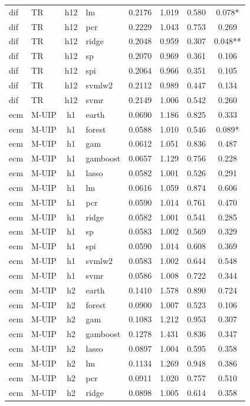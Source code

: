 \begin{ThreePartTable}
\begin{longtable}[t]{llclcccc}
dif & TR & h12 & lm & 0.2176 & 1.019 & 0.580 & 0.078*\\
dif & TR & h12 & pcr & 0.2229 & 1.043 & 0.753 & 0.269\\
dif & TR & h12 & ridge & 0.2048 & 0.959 & 0.307 & 0.048**\\
dif & TR & h12 & sp & 0.2070 & 0.969 & 0.361 & 0.106\\
dif & TR & h12 & spi & 0.2064 & 0.966 & 0.351 & 0.105\\
dif & TR & h12 & svmlw2 & 0.2112 & 0.989 & 0.447 & 0.134\\
dif & TR & h12 & svmr & 0.2149 & 1.006 & 0.542 & 0.260\\
\addlinespace
ecm & M-UIP & h1 & earth & 0.0690 & 1.186 & 0.825 & 0.333\\
ecm & M-UIP & h1 & forest & 0.0588 & 1.010 & 0.546 & 0.089*\\
ecm & M-UIP & h1 & gam & 0.0612 & 1.051 & 0.836 & 0.487\\
ecm & M-UIP & h1 & gamboost & 0.0657 & 1.129 & 0.756 & 0.228\\
ecm & M-UIP & h1 & lasso & 0.0582 & 1.001 & 0.526 & 0.291\\
ecm & M-UIP & h1 & lm & 0.0616 & 1.059 & 0.874 & 0.606\\
ecm & M-UIP & h1 & pcr & 0.0590 & 1.014 & 0.761 & 0.470\\
ecm & M-UIP & h1 & ridge & 0.0582 & 1.001 & 0.541 & 0.285\\
ecm & M-UIP & h1 & sp & 0.0583 & 1.002 & 0.569 & 0.329\\
ecm & M-UIP & h1 & spi & 0.0590 & 1.014 & 0.608 & 0.369\\
ecm & M-UIP & h1 & svmlw2 & 0.0583 & 1.002 & 0.644 & 0.548\\
ecm & M-UIP & h1 & svmr & 0.0586 & 1.008 & 0.722 & 0.344\\
\addlinespace
ecm & M-UIP & h2 & earth & 0.1410 & 1.578 & 0.890 & 0.724\\
ecm & M-UIP & h2 & forest & 0.0900 & 1.007 & 0.523 & 0.106\\
ecm & M-UIP & h2 & gam & 0.1083 & 1.212 & 0.953 & 0.307\\
ecm & M-UIP & h2 & gamboost & 0.1278 & 1.431 & 0.836 & 0.347\\
ecm & M-UIP & h2 & lasso & 0.0897 & 1.004 & 0.595 & 0.358\\
ecm & M-UIP & h2 & lm & 0.1134 & 1.269 & 0.948 & 0.386\\
ecm & M-UIP & h2 & pcr & 0.0911 & 1.020 & 0.757 & 0.510\\
ecm & M-UIP & h2 & ridge & 0.0898 & 1.005 & 0.614 & 0.358\\

\end{longtable}
\end{ThreePartTable}
